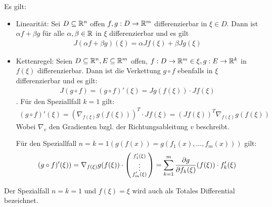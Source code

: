 \begin{satz}[Differentiationsregeln]
	Es gilt:
	\begin{itemize}
		\item  Linearität: 	Sei $D \subseteq \mathbb{R}^n$ offen $f,g : D \rightarrow \mathbb{R}^m$ differenzierbar in $\xi \in D$. Dann ist $\alpha f + \beta g$ für alle $\alpha, \beta \in \mathbb{R}$ in $\xi$ differenzierbar und es gilt 
		\begin{align*}
			J(\alpha f + \beta g)(\xi) = \alpha J f(\xi) + \beta J g(\xi)
		\end{align*}
		\item Kettenregel: Seien $D \subseteq \mathbb{R}^n, E \subseteq \mathbb{R}^m$ offen, $f : D \rightarrow \mathbb{R}^m \in \xi, g : E \rightarrow \mathbb{R}^k$ in $f(\xi)$ differenzierbar. Dann ist die Verkettung $g \circ f$ ebenfalls in $\xi$ differenzierbar und es gilt:
		\begin{align*}
			J(g \circ f) = (g \circ f)'(\xi) = Jg(f(\xi)) \cdot Jf(\xi)
		\end{align*}.
		Für den Speziallfall $k=1$ gilt:
		\begin{align*}
				(g \circ f)'(\xi) = (\nabla_{f(\xi)} g(f(\xi)))^T \cdot Jf(\xi) = (Jf(\xi))^T \nabla_{f(\xi)} g(f(\xi))
		\end{align*}
		Wobei $\nabla_v$ den Gradienten bzgl. der Richtungsableitung $v$ beschreibt.
			
		Für den Speziallfall $n=k=1 (g(f(x)) = g(f_1(x),...,f_m(x))) $ gilt:
		\begin{align*}
		 	(g \circ f)'(\xi))  =  \nabla_{f(\xi)} g(f(\xi)) \cdot \left(\begin{smallmatrix}
		 		f'_1(\xi) \\
		 		\vdots \\
		 		f'_m(\xi)
		 	\end{smallmatrix}\right) = \sum_{k=1}^{m} \frac{\partial g}{\partial f_k(\xi)} (f(\xi)) \cdot f_k'(\xi)
		\end{align*}

	\end{itemize}
	Der Spezialfall $n=k=1$ und $f(\xi) = \xi$ wird auch als Totales Differential bezeichnet.
\end{satz}


